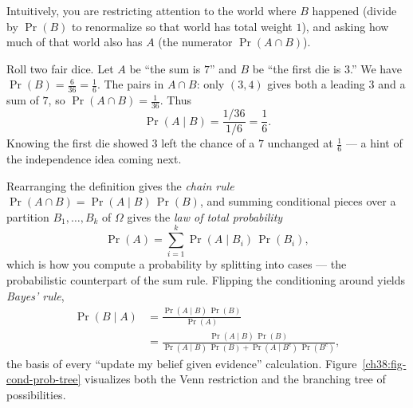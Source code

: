 Intuitively, you are restricting attention to the world where $B$ happened
(divide by $\Pr(B)$ to renormalize so that world has total weight $1$), and asking how
much of that world also has $A$ (the numerator $\Pr(A \cap B)$).

\begin{example}
\label{ch38:ex-cond}
Roll two fair dice. Let $A$ be ``the sum is $7$'' and $B$ be ``the first die is $3$.''
We have $\Pr(B) = \tfrac{6}{36} = \tfrac16$. The pairs in $A \cap B$: only $(3,4)$
gives both a leading $3$ and a sum of $7$, so $\Pr(A \cap B) = \tfrac{1}{36}$. Thus
\[
\Pr(A \mid B) = \frac{1/36}{1/6} = \frac{1}{6}.
\]
Knowing the first die showed $3$ left the chance of a $7$ unchanged at $\tfrac16$ ---
a hint of the independence idea coming next.
\end{example}

Rearranging the definition gives the \emph{chain rule}
$\Pr(A \cap B) = \Pr(A \mid B)\,\Pr(B)$, and summing conditional pieces over a
partition $B_1, \dots, B_k$ of $\Omega$ gives the \emph{law of total probability}
\[
\Pr(A) = \sum_{i=1}^{k} \Pr(A \mid B_i)\,\Pr(B_i),
\]
which is how you compute a probability by splitting into cases --- the probabilistic
counterpart of the sum rule. Flipping the conditioning around yields \emph{Bayes'
rule},
\begin{align*}
\Pr(B \mid A) &= \frac{\Pr(A \mid B)\,\Pr(B)}{\Pr(A)} \\
&= \frac{\Pr(A \mid B)\,\Pr(B)}{\Pr(A \mid B)\,\Pr(B) + \Pr(A \mid B^c)\,\Pr(B^c)},
\end{align*}
the basis of every ``update my belief given evidence'' calculation.
Figure~\ref{ch38:fig-cond-prob-tree} visualizes both the Venn restriction and the
branching tree of possibilities.

